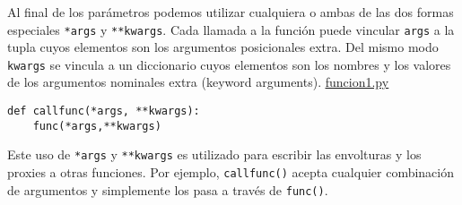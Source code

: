 \documentclass[10pt]{beamer}
\begin{document}
\begin{frame}[fragile]
\frametitle{}
Al final de los par\'ametros podemos utilizar cualquiera o ambas de las dos formas especiales \texttt{*args} y \texttt{**kwargs}. Cada llamada a la funci\'on puede vincular \texttt{args} a la tupla cuyos elementos son los argumentos posicionales extra. Del mismo modo
\texttt{kwargs} se vincula a un diccionario cuyos elementos son los nombres y los valores de los argumentos nominales extra (keyword arguments).  \href{run:funcion1.py}{\underline{funcion1.py}}

\vspace{0.2cm}



\begin{lstlisting}
def callfunc(*args, **kwargs):
    func(*args,**kwargs)
\end{lstlisting}

\vspace{0.2cm}

Este uso de  \texttt{*args} y  \texttt{**kwargs} es utilizado para escribir las envolturas y los proxies a otras funciones. Por ejemplo, \texttt{callfunc()}  acepta cualquier combinaci\'on de argumentos y simplemente los pasa a trav\'es de \texttt{func()}.
\end{frame}
\end{document}
